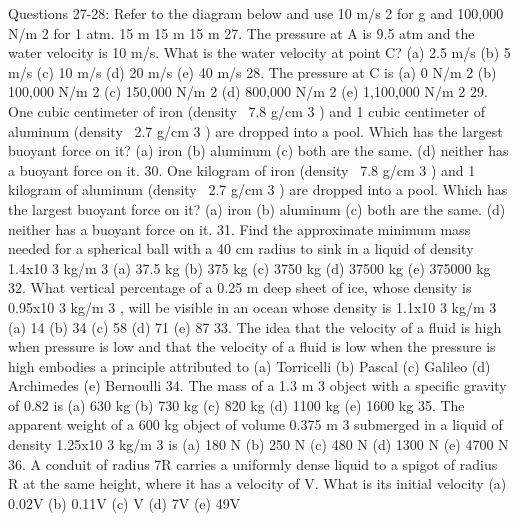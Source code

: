 Questions 27-28: Refer to the diagram below and use 10 m/s 2 for g and 100,000 N/m 2 for 1 atm.
15 m
15 m
15 m
27. The pressure at A is 9.5 atm and the water velocity is 10 m/s. What is the water velocity at point C?
(a) 2.5 m/s
(b) 5 m/s
(c) 10 m/s
(d) 20 m/s
(e) 40 m/s
28. The pressure at C is
(a) 0 N/m 2
(b) 100,000 N/m 2
(c) 150,000 N/m 2
(d) 800,000 N/m 2
(e) 1,100,000 N/m 2
29. One cubic centimeter of iron (density ~7.8 g/cm 3 ) and 1 cubic centimeter of aluminum (density ~2.7 g/cm 3 ) are
dropped into a pool. Which has the largest buoyant force on it?
(a) iron
(b) aluminum
(c) both are the same.
(d) neither has a buoyant force on it.
30. One kilogram of iron (density ~7.8 g/cm 3 ) and 1 kilogram of aluminum (density ~2.7 g/cm 3 ) are dropped into a
pool. Which has the largest buoyant force on it?
(a) iron
(b) aluminum
(c) both are the same.
(d) neither has a buoyant force on it.
31. Find the approximate minimum mass needed for a spherical ball with a 40 cm radius to sink in a liquid of
density 1.4x10 3 kg/m 3
(a) 37.5 kg (b) 375 kg
(c) 3750 kg
(d) 37500 kg
(e) 375000 kg
32. What vertical percentage of a 0.25 m deep sheet of ice, whose density is 0.95x10 3 kg/m 3 , will be visible in an
ocean whose density is 1.1x10 3 kg/m 3
(a) 14%
(b) 34%
(c) 58%
(d) 71%
(e) 87%
33. The idea that the velocity of a fluid is high when pressure is low and that the velocity of a fluid is low when the
pressure is high embodies a principle attributed to
(a) Torricelli
(b) Pascal
(c) Galileo
(d) Archimedes
(e) Bernoulli
34. The mass of a 1.3 m 3 object with a specific gravity of 0.82 is
(a) 630 kg (b) 730 kg
(c) 820 kg
(d) 1100 kg
(e) 1600 kg
35. The apparent weight of a 600 kg object of volume 0.375 m 3 submerged in a liquid of density 1.25x10 3 kg/m 3 is
(a) 180 N
(b) 250 N
(c) 480 N
(d) 1300 N
(e) 4700 N
36. A conduit of radius 7R carries a uniformly dense liquid to a spigot of radius R at the same height, where it has a
velocity of V. What is its initial velocity
(a) 0.02V
(b) 0.11V
(c) V
(d) 7V
(e) 49V



